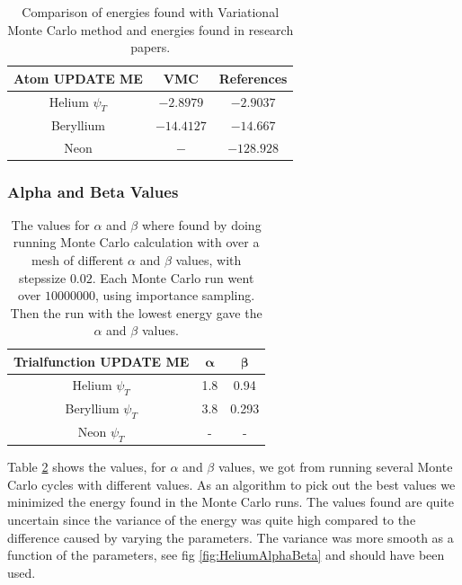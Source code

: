		\begin{table}
			\centering
			\begin{tabular}{|c|c|c|}
				\hline
				Atom \textbf{UPDATE ME} & VMC & References\tabularnewline
				\hline
				\hline
				Helium $\psi_{T}$ & $-2.8979$ & $-2.9037$ \tabularnewline
				\hline
				Beryllium & $-14.4127$ & $-14.667$\tabularnewline
				\hline
				Neon & $ - $ & $ -128.928 $\tabularnewline
				\hline
			\end{tabular}
			\protect
			\caption{Comparison of energies found with Variational Monte Carlo method and
			energies found in research papers. 	\parencite{Binkley_1975} \parencite{Koput_2011_PCCP}}
			\label{tab:energyReference1}
		\end{table}

		\subsubsection{Alpha and Beta Values}
			\begin{table}
				\center
				\begin{tabular}{| c | c| c |}
				    \hline
				   	\textbf{Trialfunction UPDATE ME} & \(\mathbf{\alpha}\) & \(\mathbf{\beta}\)
				    \\ \hline
				    Helium $\psi_{T}$ & 1.8 & 0.94
				    \\	\hline
				    Beryllium $\psi_{T}$	& 3.8	&	 0.293
				    \\ \hline
				    Neon $\psi_{T}$ & - & -
				    \\	\hline
		  		\end{tabular}
		  		\caption{The values for \(\alpha\) and \( \beta \) where found by doing running Monte Carlo calculation with over a mesh of different \(\alpha\) and \( \beta \) values, with stepssize \(0.02\). Each Monte Carlo run went over \(10 000 	000\), using importance sampling. Then the run with the lowest energy gave the \(\alpha\) and \(\beta\) values.}
			  	\label{tab:alpha_beta1}
			\end{table}

			Table \ref{tab:alpha_beta1} shows the values, for \(\alpha\) and \(\beta\) values, we got from  running several Monte Carlo cycles with different values. As an algorithm to pick out the best values we minimized the energy found in the Monte Carlo runs. The values found are quite uncertain since the variance of the energy was quite high compared to the difference caused by varying the parameters. The variance was more smooth as a function of the parameters, see fig \ref{fig:HeliumAlphaBeta} and should have been used.




